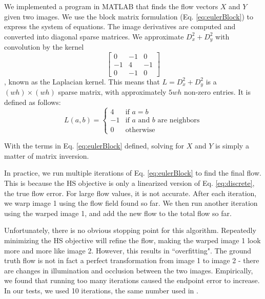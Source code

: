 \documentclass[10pt,twocolumn,letterpaper]{article}
\begin{document}
We implemented a program in MATLAB that finds the flow vectors $X$ and $Y$ given two images.  We use the block matrix formulation (Eq. \ref{eq:eulerBlock}) to express the system of equations.  The image derivatives are computed and converted into diagonal sparse matrices.  We approximate $D_x^2 + D_y^2$ with convolution by the kernel
\begin{equation} \label{eq:laplacian}
\left[ \begin{array}{ccc}
0 & -1 & 0 \\
-1 & 4 & -1 \\
0 & -1 & 0
\end{array} \right]
\end{equation}
, known as the Laplacian kernel.  This means that $L = D_x^2 + D_y^2$ is a $(wh) \times (wh)$ sparse matrix, with approximately $5wh$ non-zero entries.  It is defined as follows:
\begin{equation} \label{eq:laplacian2}
L(a, b) = \begin{cases}
4 & \text{if } a = b \\
-1 & \text{if $a$ and $b$ are neighbors} \\
0 & \text{otherwise}
\end{cases}
\end{equation}

With the terms in Eq. \ref{eq:eulerBlock} defined, solving for $X$ and $Y$ is simply a matter of matrix inversion.

In practice, we run multiple iterations of Eq. \ref{eq:eulerBlock} to find the final flow.  This is because the HS objective is only a linearized version of Eq. \ref{eq:discrete}, the true flow error.  For large flow values, it is not accurate.  After each iteration, we warp image 1 using the flow field found so far.  We then run another iteration using the warped image 1, and add the new flow to the total flow so far.

Unfortunately, there is no obvious stopping point for this algorithm.  Repeatedly minimizing the HS objective will refine the flow, making the warped image 1 look more and more like image 2.  However, this results in ``overfitting".  The ground truth flow is not in fact a perfect transformation from image 1 to image 2 - there are changes in illumination and occlusion between the two images.  Empirically, we found that running too many iterations caused the endpoint error to increase.  In our tests, we used 10 iterations, the same number used in \cite{sun}.
\end{document}
